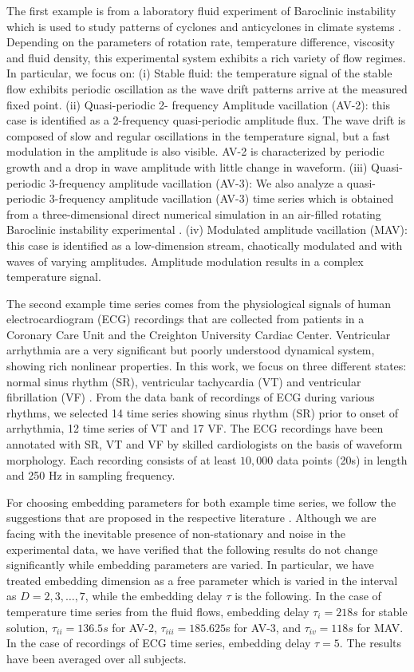\documentclass[12pt,aip,cha,reprint,nofootinbib]{revtex4-1}
\begin{document}
The first example is from a laboratory fluid experiment of Baroclinic instability which is used to study patterns of cyclones and anticyclones in climate systems \cite{Read_jfm_1992,ZouEPJST2008}. Depending on the parameters of rotation rate, temperature difference, viscosity and fluid density, this experimental system exhibits a rich variety of flow regimes. In particular, we focus on: (i) {Stable fluid:} the temperature signal of the stable flow exhibits periodic oscillation as the wave drift patterns arrive at the measured fixed point. (ii) {Quasi-periodic 2- frequency Amplitude vacillation (AV-2):} this case is identified as a 2-frequency quasi-periodic amplitude flux. The wave drift is composed of slow and regular oscillations in the temperature signal, but a fast modulation in the amplitude is also visible. AV-2 is characterized by periodic growth and a drop in wave amplitude with little change in waveform. (iii) {Quasi-periodic 3-frequency amplitude vacillation (AV-3): } We also analyze a quasi-periodic 3-frequency amplitude vacillation (AV-3) time series which is obtained from a three-dimensional direct numerical simulation in an air-filled rotating Baroclinic instability experimental \cite{Read_jfm_1992}. (iv) {Modulated amplitude vacillation (MAV):} this case is identified as a low-dimension stream, chaotically modulated and with waves of varying amplitudes. Amplitude modulation results in a complex temperature signal.

The second example time series comes from the physiological signals of human electrocardiogram (ECG) recordings that are collected from patients in a Coronary Care Unit and the Creighton University Cardiac Center. Ventricular arrhythmia are a very significant but poorly understood dynamical system, showing rich nonlinear properties. In this work, we focus on three different states: normal sinus rhythm (SR), ventricular tachycardia (VT) and ventricular fibrillation (VF) \cite{smallCSF2002}. From the data bank of recordings of ECG during various rhythms, we selected 14 time series showing sinus rhythm (SR) prior to onset of arrhythmia, 12 time series of VT and 17 VF. The ECG recordings have been annotated with SR, VT and VF by skilled cardiologists on the basis of waveform morphology. Each recording consists of at least $10,000$ data points (20s) in length and 250 Hz in sampling frequency. 

For choosing embedding parameters for both example time series, we follow the suggestions that are proposed in the respective literature \cite{ZouEPJST2008,smallCSF2002}. Although we are facing with the inevitable presence of non-stationary and noise in the experimental data, we have verified that the following results do not change significantly while embedding parameters are varied. In particular, we have treated embedding dimension as a free parameter which is varied in the interval as $D = 2, 3, \dots, 7$, while the embedding delay $\tau$ is the following. In the case of temperature time series from the fluid flows, embedding delay $\tau_{i} = 218s$ for stable solution, $\tau_{ii} = 136.5s$  for AV-2, $\tau_{iii} = 185.625$s for AV-3, and $\tau_{iv} = 118s$ for MAV. In the case of recordings of ECG time series, embedding delay $\tau = 5$. The results have been averaged over all subjects. 
\end{document}
